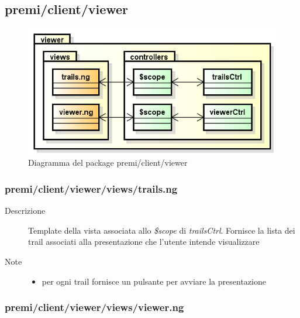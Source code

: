 \clearpage
\subsection{premi/client/viewer}
\begin{figure}[h]
\begin{center}
\includegraphics[scale=0.75]{img/diapkg/viewer.png}
\caption{Diagramma del package premi/client/viewer}
\end{center}
\end{figure}


\subsubsection{premi/client/viewer/views/trails.ng}

\begin{description}
\item[Descrizione] \hfill
	Template della vista associata allo \textit{\$scope} di \textit{trailsCtrl}. Fornisce la lista dei trail associati alla presentazione che l'utente intende visualizzare
\item[Note] \hfill
	\begin{itemize}
			\item per ogni trail fornisce un pulsante per avviare la presentazione
	\end{itemize}
\end{description}

\subsubsection{premi/client/viewer/views/viewer.ng}

